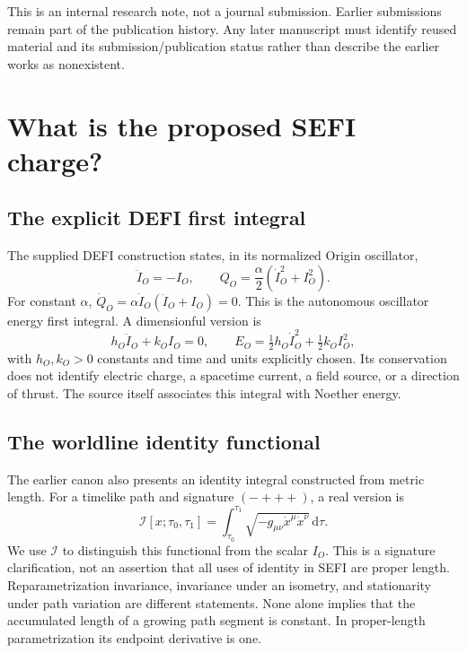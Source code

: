 \documentclass[11pt]{article}
\newcommand{\dd}{\mathrm{d}}
\begin{document}
This is an internal research note, not a journal submission. Earlier submissions remain part of the publication history. Any later manuscript must identify reused material and its submission/publication status rather than describe the earlier works as nonexistent.
\newpage
\section{What is the proposed SEFI charge?}
\subsection{The explicit DEFI first integral}
The supplied DEFI construction states, in its normalized Origin oscillator,
\begin{equation}
 \ddot I_O=-I_O,\qquad Q_O=\frac{\alpha}{2}(\dot I_O^2+I_O^2).
\end{equation}
For constant $\alpha$, $\dot Q_O=\alpha\dot I_O(\ddot I_O+I_O)=0$. This is the autonomous oscillator energy first integral. A dimensionful version is
\begin{equation}
 h_O\ddot I_O+k_O I_O=0,\qquad E_O=\tfrac12h_O\dot I_O^2+\tfrac12k_O I_O^2,
\end{equation}
with $h_O,k_O>0$ constants and time and units explicitly chosen. Its conservation does not identify electric charge, a spacetime current, a field source, or a direction of thrust. The source itself associates this integral with Noether energy.

\subsection{The worldline identity functional}
The earlier canon also presents an identity integral constructed from metric length. For a timelike path and signature $(-+++)$, a real version is
\begin{equation}
 \mathcal I[x;\tau_0,\tau_1]=\int_{\tau_0}^{\tau_1}
 \sqrt{-g_{\mu\nu}\dot x^\mu\dot x^\nu}\,\dd\tau.
\end{equation}
We use $\mathcal I$ to distinguish this functional from the scalar $I_O$. This is a signature clarification, not an assertion that all uses of identity in SEFI are proper length. Reparametrization invariance, invariance under an isometry, and stationarity under path variation are different statements. None alone implies that the accumulated length of a growing path segment is constant. In proper-length parametrization its endpoint derivative is one.
\end{document}
